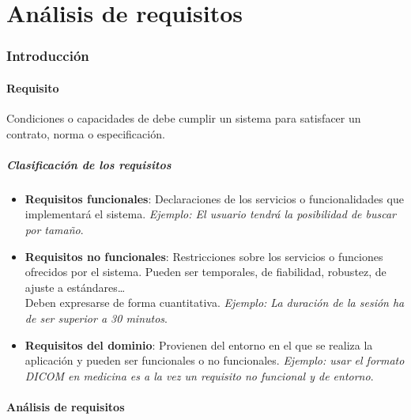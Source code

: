 \part{Análisis de requisitos}
\section{Introducción}

\subsection{Requisito}
 Condiciones o capacidades de debe cumplir un sistema para satisfacer un contrato, norma o especificación.
 
\subsubsection{Clasificación de los requisitos}
\begin{itemize} %
    \item \textbf{Requisitos funcionales}: Declaraciones de los servicios o funcionalidades que implementará el sistema. \textit{Ejemplo: El usuario tendrá la posibilidad de buscar por tamaño}.
    
    \item \textbf{Requisitos no funcionales}: Restricciones sobre los servicios o funciones ofrecidos por el sistema. Pueden ser temporales, de fiabilidad, robustez, de ajuste a estándares\ldots\\
    Deben expresarse de forma cuantitativa. 
    \textit{Ejemplo: La duración de la sesión ha de ser superior a 30 minutos}.
    
    \item \textbf{Requisitos del dominio}: Provienen del entorno en el que se realiza la aplicación y pueden ser funcionales o no funcionales. \textit{Ejemplo: usar el formato DICOM en medicina es a la vez un requisito no funcional y de entorno}.
\end{itemize}

\subsection{Análisis de requisitos}

